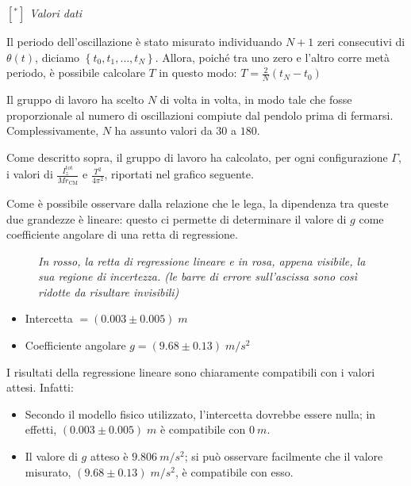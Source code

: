 \documentclass{article}
\begin{document}
\emph{$[^*]$ Valori dati}

\pagebreak
Il periodo dell'oscillazione è stato misurato individuando $N+1$ zeri
consecutivi di $\theta(t)$, diciamo $\left\{t_0,t_1,\dots,t_N\right\}$.
Allora, poiché tra uno zero e l'altro corre metà periodo, è possibile
calcolare $T$ in questo modo: $T = \frac{2}{N}(t_N - t_0)$

Il gruppo di lavoro ha scelto $N$ di volta in volta, in modo tale che
fosse proporzionale al numero di oscillazioni compiute dal pendolo
prima di fermarsi. Complessivamente, $N$ ha assunto valori da $30$ a
$180$.

\vspace{2mm}

Come descritto sopra, il gruppo di lavoro ha calcolato, per ogni
configurazione $\Gamma$,
i valori di $\frac{I_z^\text{tot}}{Mr_\text{CM}}$
e $\frac{T^2}{4\pi^2}$, riportati nel grafico seguente.

Come è possibile osservare dalla relazione che le lega, la dipendenza
tra queste due grandezze è lineare: questo ci permette di determinare
il valore di $g$ come coefficiente angolare di una retta di regressione.

\begin{center}
\begin{figure}[H]
  \caption[]{\emph{
    In rosso, la retta di regressione lineare e in rosa,
    appena visibile, la sua regione di incertezza.
    (le barre di errore sull'ascissa sono così ridotte
    da risultare invisibili)
  }}
\end{figure}
\end{center}

\begin{itemize}
  \item Intercetta $= (0.003 \pm 0.005)\;\unit{m}$
  \item Coefficiente angolare $g = (9.68 \pm 0.13)\;\unit{m\per s^2}$
\end{itemize}
\pagebreak
I risultati della regressione lineare sono chiaramente compatibili
con i valori attesi. Infatti:
\begin{itemize}
  \item Secondo il modello fisico utilizzato, l'intercetta dovrebbe
  essere nulla; in effetti, $(0.003\pm0.005)\;\unit{m}$ è compatibile
  con $\qty{0}{m}$.
  \item Il valore di $g$ atteso è $\qty{9.806}{m\per s^2}$; si può
  osservare facilmente che il valore misurato,
  $(9.68\pm0.13)\;\unit{m \per s^2}$, è compatibile con esso.
\end{itemize}
\end{document}
